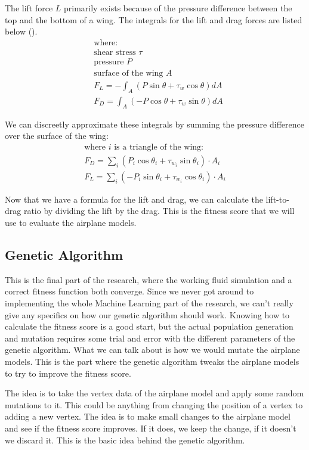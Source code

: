 \documentclass[a4paper,12pt,titlepage]{article}
\begin{document}
The lift force $L$ primarily exists because of the pressure difference between
the top and the bottom of a wing. The integrals for the lift and drag forces are
listed below (\cite{liftdrag}).
\[
	\begin{aligned}
		& \text{where:} \\
		& \text{shear stress } \tau \\
		& \text{pressure } P \\
		& \text{surface of the wing } A \\
		& F_L = -\int_A (P \sin \theta + \tau_w \cos \theta) dA \\
		& F_D = \int_A (-P \cos \theta + \tau_w \sin \theta) dA
	\end{aligned}
\]


We can discreetly approximate these integrals by summing the pressure difference
over the surface of the wing:
\[
	\begin{array}{l}
		\text{where $i$ is a triangle of the wing:} \\
		F_D = \sum\limits_i (P_i \cos \theta_i + \tau_{w_i} \sin \theta_i) \cdot A_i \\
		F_L = \sum\limits_i (-P_i \sin \theta_i + \tau_{w_i} \cos \theta_i) \cdot A_i
	\end{array}
\]

Now that we have a formula for the lift and drag, we can calculate the lift-to-drag
ratio by dividing the lift by the drag. This is the fitness score that we will
use to evaluate the airplane models.

\subsection{Genetic Algorithm} \label{genalg}
This is the final part of the research, where the working fluid simulation and a
correct fitness function both converge. Since we never got around to implementing
the whole Machine Learning part of the research, we can't really give any specifics
on how our genetic algorithm should work. Knowing how to calculate the fitness
score is a good start, but the actual population generation and mutation requires
some trial and error with the different parameters of the genetic algorithm.
What we can talk about is how we would mutate the airplane models. This is the
part where the genetic algorithm tweaks the airplane models to try to improve
the fitness score.

The idea is to take the vertex data of the airplane model and apply some random
mutations to it. This could be anything from changing the position of a vertex
to adding a new vertex. The idea is to make small changes to the airplane model
and see if the fitness score improves. If it does, we keep the change, if it
doesn't we discard it. This is the basic idea behind the genetic algorithm.
\end{document}
